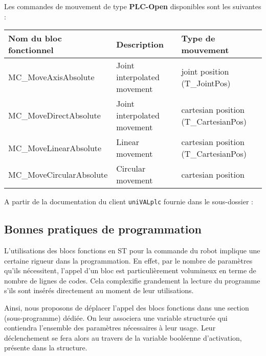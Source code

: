 Les commandes de mouvement de type \textbf{PLC-Open} disponibles sont les suivantes :
\begin{center}
    \begin{tabular}{l|l|l}
        \textbf{Nom du bloc fonctionnel} & \textbf{Description}        & \textbf{Type de mouvement}           \\
        \hline
        MC\_MoveAxisAbsolute             & Joint interpolated movement & joint position (T\_JointPos)         \\
        MC\_MoveDirectAbsolute           & Joint interpolated movement & cartesian position (T\_CartesianPos) \\
        MC\_MoveLinearAbsolute           & Linear movement             & cartesian position (T\_CartesianPos) \\
        MC\_MoveCircularAbsolute         & Circular movement           & cartesian position                   \\
    \end{tabular}
\end{center}

\begin{UPSTIPreparation}
    A partir de la documentation du client \texttt{uniVALplc} fournie dans le sous-dossier  :
    \vspace{10cm}



\end{UPSTIPreparation}

\subsection{Bonnes pratiques de programmation}
L'utilisations des blocs fonctions en ST pour la commande du robot implique une certaine rigueur dans la programmation. En effet, par le nombre de paramètres qu'ils nécessitent, l'appel d'un bloc est particulièrement volumineux en terme de nombre de lignes de codes. Cela complexifie grandement la lecture du programme s'ils sont insérés directement au moment de leur utilisations.

Ainsi, nous proposons de déplacer l'appel des blocs fonctions dans une section (sous-programme) dédiée.
On leur associera une variable structurée qui contiendra l'ensemble des paramètres nécessaires à leur usage. Leur déclenchement se fera alors au travers de la variable booléenne d'activation, présente dans la structure.

